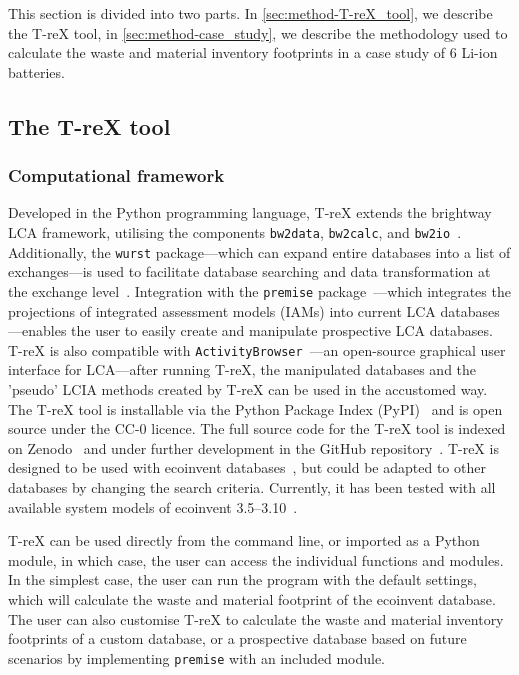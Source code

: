 This section is divided into two parts. In \autoref{sec:method-T-reX_tool}, we describe the T-reX tool, in \autoref{sec:method-case_study}, we describe the methodology used to calculate the waste and material inventory footprints in a case study of 6 Li-ion batteries.

\subsection{The T-reX tool}\label{sec:method-T-reX_tool}

\subsubsection{Computational framework}
\label{sec:method-T-reX_tool}

Developed in the Python programming language, T-reX extends the brightway LCA framework, utilising the components \texttt{bw2data}, \texttt{bw2calc}, and \texttt{bw2io}~\citep{mutel2017brightway}. Additionally, the \texttt{wurst} package---which can expand entire databases into a list of exchanges---is used to facilitate database searching and data transformation at the exchange level~\citep{mutel2017wurst}. Integration with the \texttt{premise} package~\citep{sacchi2022premise}---which integrates the projections of integrated assessment models (IAMs) into current LCA databases---enables the user to easily create and manipulate prospective LCA databases. T-reX is also compatible with \texttt{ActivityBrowser}~\citep{steubing2020activitybrowser}---an open-source graphical user interface for LCA---after running T-reX, the manipulated databases and the 'pseudo' LCIA methods created by T-reX can be used in the accustomed way. The T-reX tool is installable via the Python Package Index (PyPI)~\citep{mcdowall2023T-reXpipy} and is open source under the CC-0 licence. The full source code for the T-reX tool is indexed on Zenodo~\citep{mcdowall2023T-reXzenodo} and under further development in the GitHub repository~\citep{mcdowall2024T-reXgithub}. T-reX is designed to be used with ecoinvent databases~\citep{ecoinvent2016version3}, but could be adapted to other databases by changing the search criteria. Currently, it has been tested with all available system models of ecoinvent 3.5--3.10~\citep{ecoinvent2016version3}.

T-reX can be used directly from the command line, or imported as a Python module, in which case, the user can access the individual functions and modules. In the simplest case, the user can run the program with the default settings, which will calculate the waste and material footprint of the ecoinvent database. The user can also customise T-reX to calculate the waste and material inventory footprints of a custom database, or a prospective database based on future scenarios by implementing \texttt{premise} with an included module.

